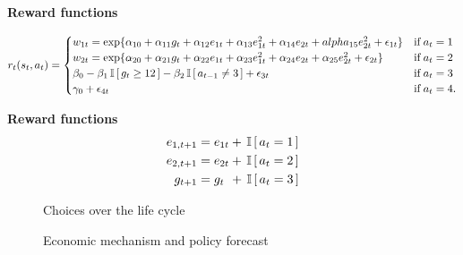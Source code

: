 \begin{frame}
  \textbf{Reward functions}\vspace{0.5cm}

  \begin{align*}
  r_t(s_t, a_t) = \begin{cases} w_{1t} =
  \exp\{\alpha_{10} + \alpha_{11}g_t + \alpha_{12}e_{1t} + \alpha_{13}e^2_{1t} + \alpha_{14}e_{2t} + alpha_{15}e^2_{2t} + \epsilon_{1t}\} & \text{if}\; a_t = 1 \\
  w_{2t} = \exp\{\alpha_{20} + \alpha_{21}g_t + \alpha_{22}e_{1t} + \alpha_{23}e^2_{1t} + \alpha_{24}e_{2t} + \alpha_{25}e^2_{2t} + \epsilon_{2t}\}& \text{if}\; a_t = 2 \\
  \beta_0 - \beta_1 \,\mathbb{I}\,[\,g_t \geq 12\,] - \beta_2\,\mathbb{I}\,[\,a_{t - 1} \neq 3\,] + \epsilon_{3t}& \text{if}\; a_t = 3 \\
  \gamma_0 + \epsilon_{4t}& \text{if}\; a_t = 4. \\
  \end{cases}
  \end{align*}
\end{frame}
\begin{frame}
  \textbf{Reward functions}\vspace{0.5cm}
\begin{align*}
    e_{1,t+1} &= e_{1t} + \,\mathbb{I}\,[\,a_t = 1\,] \\
    e_{2,t+1} &= e_{2t} + \,\mathbb{I}\,[\,a_t = 2\,] \\
    g_{t+1}   &= g_{t\phantom{2}}    +  \,\mathbb{I}\,[\,a_t = 3\,]
\end{align*}
\end{frame}
\begin{frame}
  \begin{figure}
  \caption{Choices over the life cycle}\label{Choices over the life cycle}
  \end{figure}
\end{frame}
\begin{frame}
  \begin{figure}[h!]\centering
  \caption{Economic mechanism and policy forecast}\label{Economic mechanism and policy forecast}
  \hspace{0.3cm}
  \end{figure}
\end{frame}

